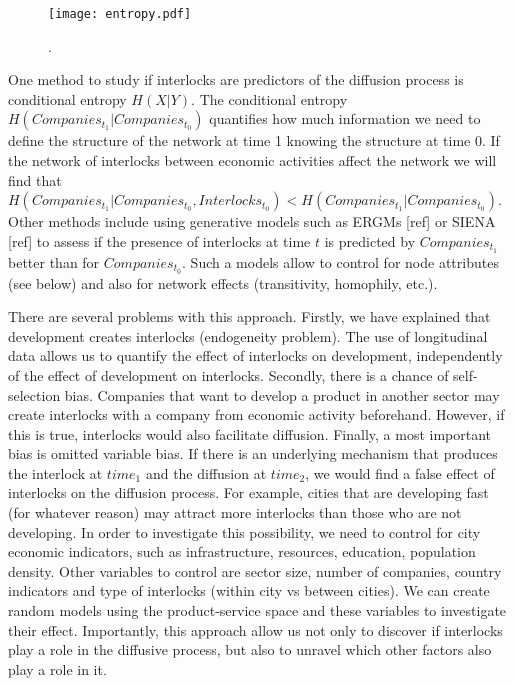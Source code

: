 \begin{figure}
\begin{center}
\texttt{[image: entropy.pdf]}
\caption{.}
\label{fig:entropy}
\end{center}
\end{figure}

One method to study if interlocks are predictors of the diffusion process is conditional entropy $H(X|Y)$.
The conditional entropy  $H(Companies_{t_1}|Companies_{t_0})$ quantifies how much information we need to define the structure of the network at time 1 knowing the structure at time 0. 
If the network of interlocks between economic activities affect the network we will find that $H(Companies_{t_1}|Companies_{t_0},Interlocks_{t_0}) < H(Companies_{t_1}|Companies_{t_0})$.
Other methods include using generative models such as ERGMs [ref] or SIENA [ref] to assess if the presence of interlocks at time $t$ is predicted by $Companies_{t_1}$
better than for $Companies_{t_0}$.
Such a models allow to control for node attributes (see below) and also for network effects (transitivity, homophily, etc.).

There are several problems with this approach.
Firstly, we have explained that development creates interlocks (endogeneity problem).
The use of longitudinal data allows us to quantify the effect of interlocks on development,
independently of the effect of development on interlocks.
Secondly, there is a chance of self-selection bias.
Companies that want to develop a product in another sector may create interlocks with a company from economic activity beforehand.
However, if this is true, interlocks would also facilitate diffusion.
Finally, a most important bias is omitted variable bias.
If there is an underlying mechanism that produces the interlock at $time_1$ and the diffusion at $time_2$, 
we would find a false effect of interlocks on the diffusion process.
For example, cities that are developing fast (for whatever reason) may attract more interlocks than those who are not developing.
In order to investigate this possibility, we need to control for city economic indicators, such as infrastructure, resources, education, population density.
Other variables to control are sector size, number of companies, country indicators and type of interlocks (within city vs between cities).
We can create random models using the product-service space and these variables to investigate their effect.
Importantly, this approach allow us not only to discover if interlocks play a role in the diffusive process, 
but also to unravel which other factors also play a role in it.


